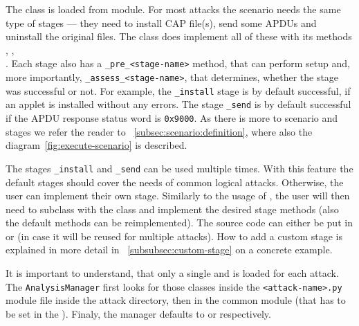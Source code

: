             The class \scenario is loaded from  module. For most attacks the scenario needs the same type of stages --- they need to install CAP file(s), send some APDUs and uninstall the original files. The class \shortexecutorclass does implement all of these with its methods \stageinstall, \stagesend,\\ \stageuninstall. Each stage also has a \texttt{_pre_<stage-name>} method, that can perform setup and, more importantly, \texttt{_assess_<stage-name>}, that determines, whether the stage was successful or not. For example, the \texttt{_install} stage is by default successful, if an applet is installed without any errors. The stage \texttt{_send} is by default successful if the APDU response status word is \texttt{0x9000}. As there is more to scenario and stages we refer the reader to ~\ref{subsec:scenario:definition}, where also the diagram~\ref{fig:execute-scenario} is described.

        The stages \texttt{_install} and \texttt{_send} can be used multiple times. With this feature the default stages should cover the needs of common logical attacks. Otherwise, the user can implement their own stage. Similarly to the usage of \shortbuilderclass, the user will then need to subclass \shortexecutorclass with the class \attackexecutor and implement the desired stage methods (also the default methods can be reimplemented). The source code can either be put in  or  (in case it will be reused for multiple attacks). How to add a custom stage is explained in more detail in ~\ref{subsubsec:custom-stage} on a concrete example.

        It is important to understand, that only a single \attackbuilder and \attackexecutor is loaded for each attack. The \texttt{AnalysisManager} first looks for those classes inside the \texttt{<attack-name>.py} module file inside the attack directory, then in the common module  (that has to be set in the ). Finaly, the manager defaults to \shortbuilderclass or \shortexecutorclass respectively.

